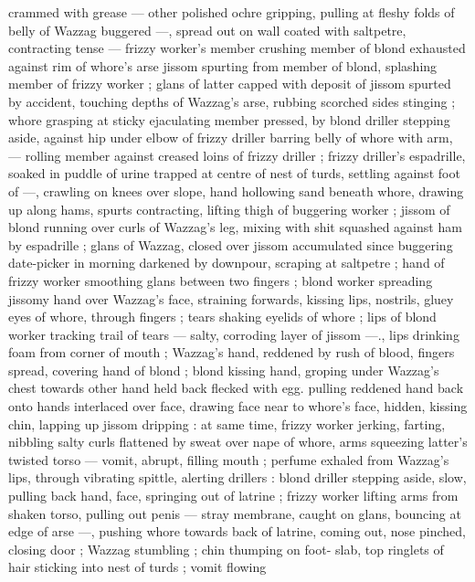 crammed with grease --- other polished ochre gripping, pulling at 
fleshy folds of belly of Wazzag buggered ---, spread out on wall 
coated with saltpetre, contracting tense --- frizzy worker's member 
crushing member of blond exhausted against rim of whore's arse 
jissom spurting from member of blond, splashing member of frizzy 
worker ; glans of latter capped with deposit of jissom spurted by 
accident, touching depths of Wazzag's arse, rubbing scorched sides 
stinging ; whore grasping at sticky ejaculating member pressed, by 
blond driller stepping aside, against hip under elbow of frizzy driller 
barring belly of whore with arm, --- rolling member against creased 
loins of frizzy driller ; frizzy driller's espadrille, soaked in puddle of 
urine trapped at centre of nest of turds, settling against foot of 
---, crawling on knees over slope, hand hollowing sand beneath 
whore, drawing up along hams, spurts contracting, lifting thigh of 
buggering worker ; jissom of blond running over curls of Wazzag's 
leg, mixing with shit squashed against ham by espadrille ; glans of 
Wazzag, closed over jissom accumulated since buggering date-picker 
in morning darkened by downpour, scraping at saltpetre ; hand of 
frizzy worker smoothing glans between two fingers ; blond worker 
spreading jissomy hand over Wazzag's face, straining forwards, 
kissing lips, nostrils, gluey eyes of whore, through fingers ; tears 
shaking eyelids of whore ; lips of blond worker tracking trail of tears 
--- salty, corroding layer of jissom ---., lips drinking foam from corner 
of mouth ; Wazzag's hand, reddened by rush of blood, fingers 
spread, covering hand of blond ; blond kissing hand, groping under 
Wazzag's chest towards other hand held back flecked with egg. 
pulling reddened hand back onto hands interlaced over face, drawing 
face near to whore's face, hidden, kissing chin, lapping up jissom 
dripping : at same time, frizzy worker jerking, farting, nibbling salty 
curls flattened by sweat over nape of whore, arms squeezing latter's 
twisted torso --- vomit, abrupt, filling mouth ; perfume exhaled from 
Wazzag's lips, through vibrating spittle, alerting drillers : blond 
driller stepping aside, slow, pulling back hand, face, springing out of 
latrine ; frizzy worker lifting arms from shaken torso, pulling out 
penis --- stray membrane, caught on glans, bouncing at edge of arse 
---, pushing whore towards back of latrine, coming out, nose 
pinched, closing door ; Wazzag stumbling ; chin thumping on foot- 
slab, top ringlets of hair sticking into nest of turds ; vomit flowing 
